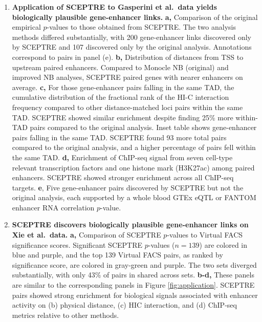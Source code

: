 \documentclass{article}
\begin{document}
\begin{enumerate}
\item \textbf{Application of SCEPTRE to Gasperini et al.\ data yields biologically plausible gene-enhancer links.} \textbf{a,} Comparison of the original empirical $p$-values to those obtained from SCEPTRE. The two analysis methods differed substantially, with 200 gene-enhancer links discovered only by SCEPTRE and 107 discovered only by the original analysis. Annotations correspond to pairs in panel (e). \textbf{b,} Distribution of distances from TSS to upstream paired enhancers. Compared to Monocle NB (original) and improved NB analyses, SCEPTRE paired genes with nearer enhancers on average. \textbf{c,} For those gene-enhancer pairs falling in the same TAD, the cumulative distribution of the fractional rank of the HI-C interaction frequency compared to other distance-matched loci pairs within the same TAD. SCEPTRE showed similar enrichment despite finding 25\% more within-TAD pairs compared to the original analysis. Inset table shows gene-enhancer pairs falling in the same TAD. SCEPTRE found 93 more total pairs compared to the original analysis, and a higher percentage of pairs fell within the same TAD. \textbf{d,} Enrichment of ChIP-seq signal from seven cell-type relevant transcription factors and one histone mark (H3K27ac) among paired enhancers. SCEPTRE showed stronger enrichment across all ChIP-seq targets. \textbf{e}, Five gene-enhancer pairs discovered by SCEPTRE but not the original analysis, each supported by a whole blood GTEx eQTL or FANTOM enhancer RNA correlation $p$-value.
\item \textbf{SCEPTRE discovers biologically plausible gene-enhancer links on Xie et al.\ data.} \textbf{a,} Comparison of SCEPTRE $p$-values to Virtual FACS significance scores. Significant SCEPTRE $p$-values ($n = 139$) are colored in blue and purple, and the top 139 Virtual FACS pairs, as ranked by significance score, are colored in gray-green and purple. The two sets diverged substantially, with only 43\% of pairs in shared across sets. \textbf{b-d,} These panels are similar to the corresponding panels in Figure \ref{fig:application}. SCEPTRE pairs showed strong enrichment for biological signals associated with enhancer activity on (b) physical distance, (c) HIC interaction, and (d) ChIP-seq metrics relative to other methods.
\end{enumerate}
\end{document}
